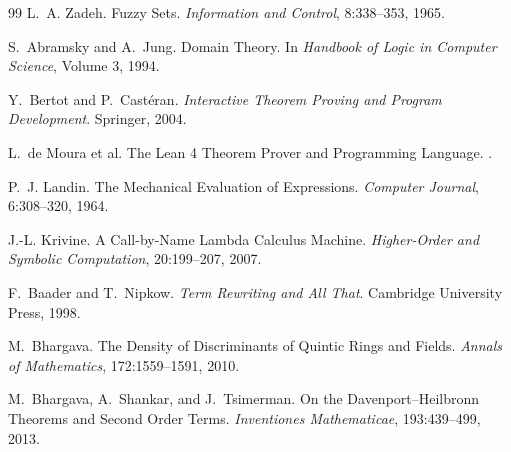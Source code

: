 \documentclass[12pt,oneside]{article}
\theoremstyle{definition}
\theoremstyle{remark}
\begin{document}
\begin{thebibliography}{99}
L.~A. Zadeh.
\newblock Fuzzy Sets.
\newblock \emph{Information and Control}, 8:338--353, 1965.


S.~Abramsky and A.~Jung.
\newblock Domain Theory.
\newblock In \emph{Handbook of Logic in Computer Science}, Volume 3, 1994.


Y.~Bertot and P.~Cast{\'e}ran.
\newblock \emph{Interactive Theorem Proving and Program Development}.
\newblock Springer, 2004.

L.~de Moura et al.
\newblock The Lean 4 Theorem Prover and Programming Language.
.


P.~J. Landin.
\newblock The Mechanical Evaluation of Expressions.
\newblock \emph{Computer Journal}, 6:308--320, 1964.

J.-L. Krivine.
\newblock A Call-by-Name Lambda Calculus Machine.
\newblock \emph{Higher-Order and Symbolic Computation}, 20:199--207, 2007.


F.~Baader and T.~Nipkow.
\newblock \emph{Term Rewriting and All That}.
\newblock Cambridge University Press, 1998.


M.~Bhargava.
\newblock The Density of Discriminants of Quintic Rings and Fields.
\newblock \emph{Annals of Mathematics}, 172:1559--1591, 2010.

M.~Bhargava, A.~Shankar, and J.~Tsimerman.
\newblock On the Davenport--Heilbronn Theorems and Second Order Terms.
\newblock \emph{Inventiones Mathematicae}, 193:439--499, 2013.


\end{thebibliography}
\end{document}
